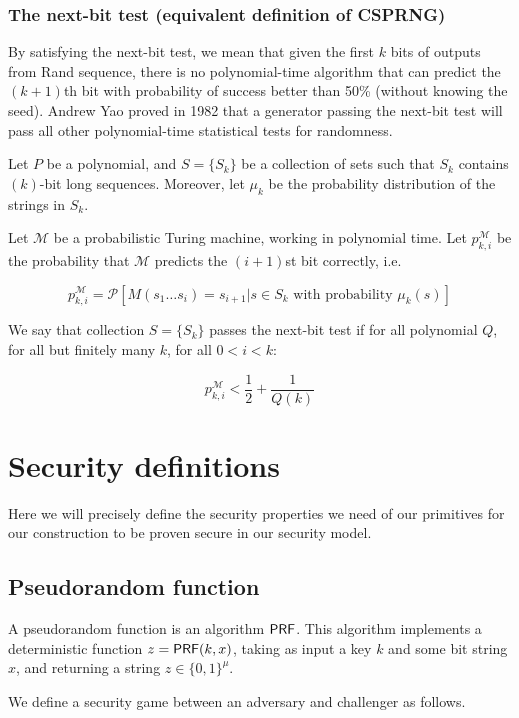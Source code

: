 \documentclass[12pt]{article}
\begin{document}
\subsubsection*{The next-bit test (equivalent definition of CSPRNG)}
By satisfying the next-bit test, we mean that given the first $k$ bits of outputs from Rand sequence, there is no polynomial-time algorithm that can predict the $(k+1)$th bit with probability of success better than 50\% (without knowing the seed). Andrew Yao proved in 1982 that a generator passing the next-bit test will pass all other polynomial-time statistical tests for randomness.

Let $P$ be a polynomial, and $S=\{S_k\}$ be a collection of sets such that $S_k$ contains $(k)$-bit long sequences. Moreover, let $\mu_k$ be the probability distribution of the strings in $S_k$.

Let $\mathcal{M}$ be a probabilistic Turing machine, working in polynomial time. Let $p_{k,i}^{\mathcal{M}}$ be the probability that $\mathcal{M}$ predicts the $(i+1)$st bit correctly, i.e.

$$p_{k,i}^{\mathcal{M}}={\mathcal{P}}[M(s_1\ldots s_i)=s_{i+1} | s\in S_k\text{ with probability }\mu_k(s)]$$

We say that collection $S = \{ S_k \}$ passes the next-bit test if for all polynomial $Q$, for all but finitely many $k$, for all $0 < i < k$: 

$$
p_{k,i}^{\mathcal M}<\frac{1}{2}+\frac{1}{Q(k)}
$$

\section{Security definitions} \label{sec:def}

Here we will precisely define the security properties we need of our primitives for our construction to be proven secure in our security model.

\subsection{Pseudorandom function} \label{PRFdef}
A pseudorandom function is an algorithm $\mathsf{PRF}$. This algorithm implements a deterministic function $z=\mathsf{PRF}(k, x)$, taking as input a key $k$ and some bit string $x$, and returning a string $z \in \{0, 1 \}^{\mu}$. 

We define a security game between an adversary and challenger as follows.
\end{document}

